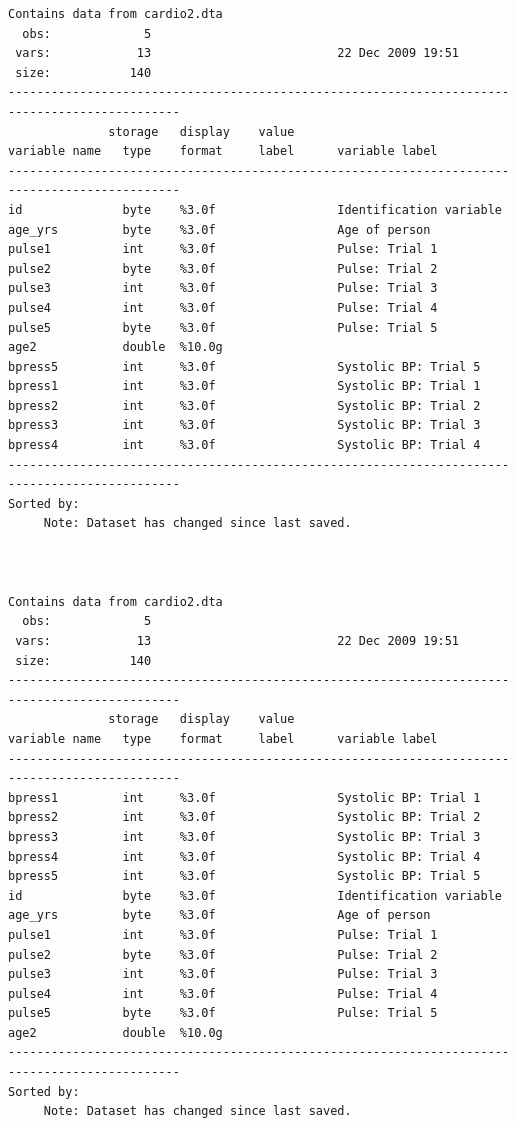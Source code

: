 \documentclass[
]{book}
\begin{document}
\begin{verbatim}
Contains data from cardio2.dta
  obs:             5                          
 vars:            13                          22 Dec 2009 19:51
 size:           140                          
----------------------------------------------------------------------------------------------
              storage   display    value
variable name   type    format     label      variable label
----------------------------------------------------------------------------------------------
id              byte    %3.0f                 Identification variable
age_yrs         byte    %3.0f                 Age of person
pulse1          int     %3.0f                 Pulse: Trial 1
pulse2          byte    %3.0f                 Pulse: Trial 2
pulse3          int     %3.0f                 Pulse: Trial 3
pulse4          int     %3.0f                 Pulse: Trial 4
pulse5          byte    %3.0f                 Pulse: Trial 5
age2            double  %10.0g                
bpress5         int     %3.0f                 Systolic BP: Trial 5
bpress1         int     %3.0f                 Systolic BP: Trial 1
bpress2         int     %3.0f                 Systolic BP: Trial 2
bpress3         int     %3.0f                 Systolic BP: Trial 3
bpress4         int     %3.0f                 Systolic BP: Trial 4
----------------------------------------------------------------------------------------------
Sorted by: 
     Note: Dataset has changed since last saved.



Contains data from cardio2.dta
  obs:             5                          
 vars:            13                          22 Dec 2009 19:51
 size:           140                          
----------------------------------------------------------------------------------------------
              storage   display    value
variable name   type    format     label      variable label
----------------------------------------------------------------------------------------------
bpress1         int     %3.0f                 Systolic BP: Trial 1
bpress2         int     %3.0f                 Systolic BP: Trial 2
bpress3         int     %3.0f                 Systolic BP: Trial 3
bpress4         int     %3.0f                 Systolic BP: Trial 4
bpress5         int     %3.0f                 Systolic BP: Trial 5
id              byte    %3.0f                 Identification variable
age_yrs         byte    %3.0f                 Age of person
pulse1          int     %3.0f                 Pulse: Trial 1
pulse2          byte    %3.0f                 Pulse: Trial 2
pulse3          int     %3.0f                 Pulse: Trial 3
pulse4          int     %3.0f                 Pulse: Trial 4
pulse5          byte    %3.0f                 Pulse: Trial 5
age2            double  %10.0g                
----------------------------------------------------------------------------------------------
Sorted by: 
     Note: Dataset has changed since last saved.
\end{verbatim}
\end{document}
